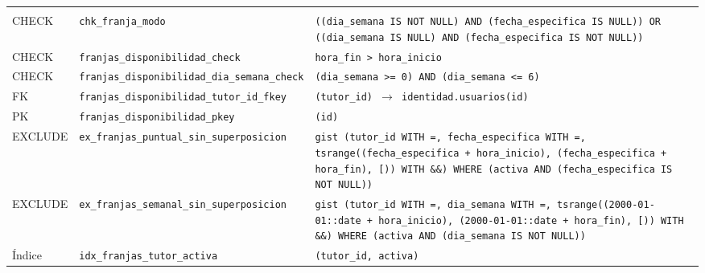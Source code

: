 {\small
\begin{xltabular}{\textwidth}{@{}>{\raggedright\arraybackslash}p{1.7cm} >{\raggedright\arraybackslash}p{4.6cm} L@{}}
    \toprule
     &  &  \\
    \midrule
    \endfirsthead
    \toprule
     &  &  \\
    \midrule
    \endhead
    \bottomrule
    \endfoot
    CHECK & \texttt{chk\_\allowbreak{}franja\_\allowbreak{}modo} & \texttt{(\allowbreak{}(\allowbreak{}dia\_\allowbreak{}semana IS NOT NULL) AND (\allowbreak{}fecha\_\allowbreak{}especifica IS NULL)) OR (\allowbreak{}(\allowbreak{}dia\_\allowbreak{}semana IS NULL) AND (\allowbreak{}fecha\_\allowbreak{}especifica IS NOT NULL))} \\
    CHECK & \texttt{franjas\_\allowbreak{}disponibilidad\_\allowbreak{}check} & \texttt{hora\_\allowbreak{}fin \textgreater{} hora\_\allowbreak{}inicio} \\
    CHECK & \texttt{franjas\_\allowbreak{}disponibilidad\_\allowbreak{}dia\_\allowbreak{}semana\_\allowbreak{}check} & \texttt{(\allowbreak{}dia\_\allowbreak{}semana \textgreater{}= 0) AND (\allowbreak{}dia\_\allowbreak{}semana \textless{}= 6)} \\
    FK & \texttt{franjas\_\allowbreak{}disponibilidad\_\allowbreak{}tutor\_\allowbreak{}id\_\allowbreak{}fkey} & \texttt{(\allowbreak{}tutor\_\allowbreak{}id) $\rightarrow$ identidad.usuarios(\allowbreak{}id)} \\
    PK & \texttt{franjas\_\allowbreak{}disponibilidad\_\allowbreak{}pkey} & \texttt{(\allowbreak{}id)} \\
    EXCLUDE & \texttt{ex\_\allowbreak{}franjas\_\allowbreak{}puntual\_\allowbreak{}sin\_\allowbreak{}superposicion} & \texttt{gist (\allowbreak{}tutor\_\allowbreak{}id WITH =,\allowbreak{} fecha\_\allowbreak{}especifica WITH =,\allowbreak{} tsrange(\allowbreak{}(\allowbreak{}fecha\_\allowbreak{}especifica + hora\_\allowbreak{}inicio),\allowbreak{} (\allowbreak{}fecha\_\allowbreak{}especifica + hora\_\allowbreak{}fin),\allowbreak{} \textquotesingle{}[)\textquotesingle{}) WITH \&\&) WHERE (\allowbreak{}activa AND (\allowbreak{}fecha\_\allowbreak{}especifica IS NOT NULL))} \\
    EXCLUDE & \texttt{ex\_\allowbreak{}franjas\_\allowbreak{}semanal\_\allowbreak{}sin\_\allowbreak{}superposicion} & \texttt{gist (\allowbreak{}tutor\_\allowbreak{}id WITH =,\allowbreak{} dia\_\allowbreak{}semana WITH =,\allowbreak{} tsrange(\allowbreak{}(\allowbreak{}\textquotesingle{}2000-01-01\textquotesingle{}::date + hora\_\allowbreak{}inicio),\allowbreak{} (\allowbreak{}\textquotesingle{}2000-01-01\textquotesingle{}::date + hora\_\allowbreak{}fin),\allowbreak{} \textquotesingle{}[)\textquotesingle{}) WITH \&\&) WHERE (\allowbreak{}activa AND (\allowbreak{}dia\_\allowbreak{}semana IS NOT NULL))} \\
    Índice & \texttt{idx\_\allowbreak{}franjas\_\allowbreak{}tutor\_\allowbreak{}activa} & \texttt{(\allowbreak{}tutor\_\allowbreak{}id,\allowbreak{} activa)} \\
\end{xltabular}
}

